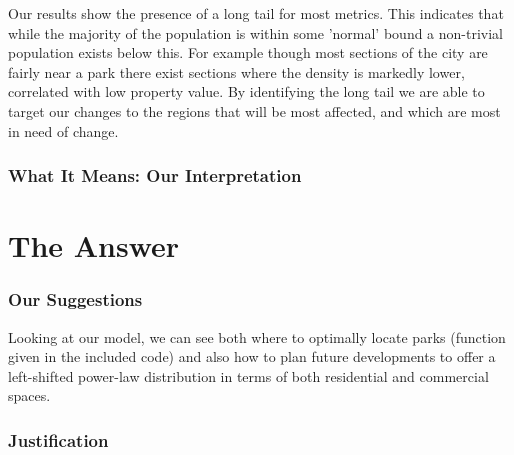 \documentclass[]{report}
\begin{document}
	Our results show the presence of a long tail for most metrics. This indicates that while the majority of the population is within some 'normal' bound a non-trivial population exists below this. For example though most sections of the city are fairly near a park there exist sections where the density is markedly lower, correlated with low property value. By identifying the long tail we are able to target our changes to the regions that will be most affected, and which are most in need of change. 
	
	\section{What It Means: Our Interpretation}
	
	
\part{The Answer}
	\section{Our Suggestions}
	Looking at our model, we can see both where to optimally locate parks (function given in the included code) and also how to plan future developments to offer a left-shifted power-law distribution in terms of both residential and commercial spaces.
	
	\section{Justification}
	
\end{document}
